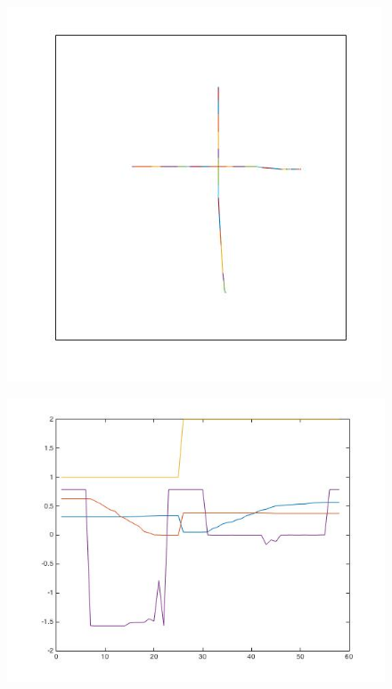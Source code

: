 \begin{figure}[H]
	\centering
	\begin{minipage}{.45\textwidth}
		\centering
		\includegraphics[width=.7\linewidth]{images/+_drawing}
		\label{fig:features_T}
	\end{minipage}%
	\begin{minipage}{.45\textwidth}
		\centering
		\includegraphics[width=.99\linewidth]{images/+_graph}
		\label{fig:features_plus}
	\end{minipage}
\end{figure}